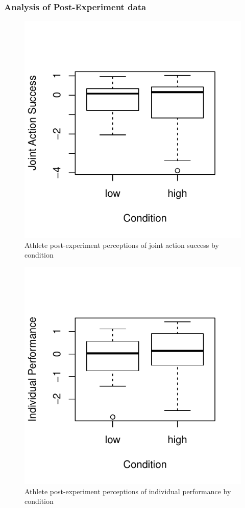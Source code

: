 \subsubsection{Analysis of Post-Experiment data\label{app6:postExperimentData}}




\begin{figure}
    \centering \includegraphics[width=0.5\linewidth,keepaspectratio] {images/groupJointActionSuccessPostBoxPlot-1}
    \caption{Athlete post-experiment perceptions of joint action success by condition}
              \label{fig:groupJointActionSuccessPostBoxPlot}
\end{figure}

\begin{figure}
  \centering
  \includegraphics[width=0.5\linewidth,keepaspectratio] {images/indComponentPerformancePostBoxPlot-1}
  \caption{Athlete post-experiment perceptions of individual performance by condition}
    \label{fig:indComponentPerformancePostBoxPlot}
\end{figure}

